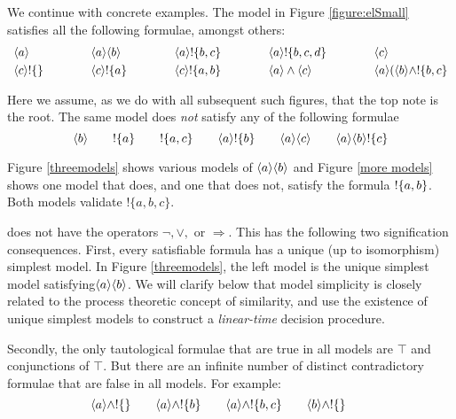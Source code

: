 

We continue with concrete examples.  The model in Figure
\ref{figure:elSmall} satisfies all the following formulae, amongst
others:
\[
\begin{array}{lclclclcl}
\MAY{a} &\qquad&
\MAY{a} \MAY{b} &\qquad&
\MAY{a} \fBang \{b,c\} &\qquad&
\MAY{a} \fBang \{b,c,d\} &\qquad&
\MAY{c} \\[1mm]
\MAY{c} \fBang \{\} &&
\MAY{c} \fBang \{a\} &&
\MAY{c} \fBang \{a,b\} &&
\MAY{a} \land \MAY{c} &&
\MAY{a} (\MAY{b} \land \fBang \{b,c\}
\end{array}
\]

\NI Here we assume, as we do with all subsequent such figures, that
the top note is the root.  The same model does \emph{not} satisfy any
of the following formulae
\[
\langle b \rangle \qquad
! \{a\} \qquad
! \{a, c\} \qquad
\langle a \rangle ! \{b\} \qquad
\langle a \rangle \langle c \rangle \qquad
\langle a \rangle \langle b \rangle ! \{c\} 
\]

\NI Figure \ref{threemodels} shows various models of $\MAY{a} \MAY{b}$
and Figure \ref{more models} shows one model that does, and one that
does not, satisfy the formula $! \{a,b\}$.  Both models validate
$!\{a, b, c\}$.

\ELABR{} does not have the operators $\neg, \lor, $ or $\Rightarrow$.
This has the following two signification consequences.  First, every
satisfiable formula has a unique (up to isomorphism) simplest model.
In Figure \ref{threemodels}, the left model is the unique simplest
model satisfying$\MAY{a} \MAY{b}$.  We will clarify below that model
simplicity is closely related to the process theoretic concept of
similarity, and use the existence of unique simplest models to
construct a \emph{linear-time} decision procedure.





Secondly, the only tautological formulae that are true in all models
are $\top$ and conjunctions of $\top$.  But there are an infinite
number of distinct contradictory formulae that are false in all
models.  For example:
\[
   \langle a \rangle \land ! \{\} \qquad
   \langle a \rangle \land ! \{b\} \qquad
   \langle a \rangle \land ! \{b, c\} \qquad
   \langle b \rangle \land ! \{\} \qquad
\]


